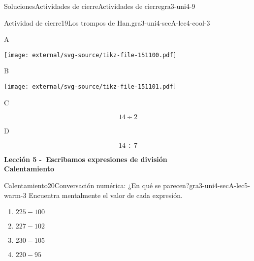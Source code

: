 \documentclass[twoside,10pt,]{article}
\begin{document}
\begin{solutions-section}{Soluciones}{Actividades de cierre}{}{Actividades de cierre}{}{}{gra3-uni4-9}
\begin{projectsolution}{Actividad de cierre}{19}{Los trompos de Han.}{gra3-uni4-secA-lec4-cool-3}
\begin{sidebyside}{4}{0.0075}{0.0075}{0.015}
\begin{sbspanel}{0.02}%
A%
\end{sbspanel}%
\begin{sbspanel}{0.45}%
\texttt{[image: external/svg-source/tikz-file-151100.pdf]}
\end{sbspanel}%
\begin{sbspanel}{0.02}%
B%
\end{sbspanel}%
\begin{sbspanel}{0.45}%
\texttt{[image: external/svg-source/tikz-file-151101.pdf]}
\end{sbspanel}%
\end{sidebyside}%
\begin{sidebyside}{4}{0.0075}{0.0075}{0.015}%
\begin{sbspanel}{0.02}%
C%
\end{sbspanel}%
\begin{sbspanel}{0.45}%
\par
%
\begin{equation*}
14\div 2
\end{equation*}
%
\end{sbspanel}%
\begin{sbspanel}{0.02}%
\par
D%
\end{sbspanel}%
\begin{sbspanel}{0.45}%
\par
%
\begin{equation*}
14\div 7
\end{equation*}
%
\end{sbspanel}%
\end{sidebyside}%
\end{projectsolution}%
\par\medskip
\noindent\textbf{\large{}\space\textperiodcentered\space{}Lección 5 -~Escribamos expresiones de división\\
\space\textperiodcentered\space{}Calentamiento}
\begin{explorationsolution}{Calentamiento}{20}{Conversación numérica: ¿En qué se parecen?}{gra3-uni4-secA-lec5-warm-3}%
Encuentra mentalmente el valor de cada expresión.%
\par
%
\begin{enumerate}
\item{}\(\displaystyle 225 - 100\)%
\item{}\(\displaystyle 227 - 102\)%
\item{}\(\displaystyle 230 - 105\)%
\item{}\(\displaystyle 220 - 95\)%

\end{enumerate}
\end{explorationsolution}
\end{solutions-section}
\end{document}
